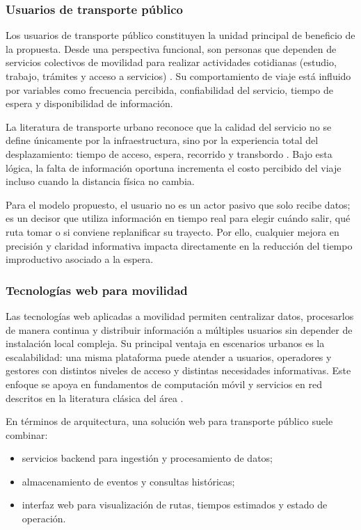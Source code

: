 \subsubsection{Usuarios de transporte público}

Los usuarios de transporte público constituyen la unidad principal de beneficio de la propuesta. Desde una perspectiva funcional, son personas que dependen de servicios colectivos de movilidad para realizar actividades cotidianas (estudio, trabajo, trámites y acceso a servicios) \cite{vuchic2007}. Su comportamiento de viaje está influido por variables como frecuencia percibida, confiabilidad del servicio, tiempo de espera y disponibilidad de información.

La literatura de transporte urbano reconoce que la calidad del servicio no se define únicamente por la infraestructura, sino por la experiencia total del desplazamiento: tiempo de acceso, espera, recorrido y transbordo \cite{vuchic2005}. Bajo esta lógica, la falta de información oportuna incrementa el costo percibido del viaje incluso cuando la distancia física no cambia.

Para el modelo propuesto, el usuario no es un actor pasivo que solo recibe datos; es un decisor que utiliza información en tiempo real para elegir cuándo salir, qué ruta tomar o si conviene replanificar su trayecto. Por ello, cualquier mejora en precisión y claridad informativa impacta directamente en la reducción del tiempo improductivo asociado a la espera.

\subsubsection{Tecnologías web para movilidad}

Las tecnologías web aplicadas a movilidad permiten centralizar datos, procesarlos de manera continua y distribuir información a múltiples usuarios sin depender de instalación local compleja. Su principal ventaja en escenarios urbanos es la escalabilidad: una misma plataforma puede atender a usuarios, operadores y gestores con distintos niveles de acceso y distintas necesidades informativas. Este enfoque se apoya en fundamentos de computación móvil y servicios en red descritos en la literatura clásica del área \cite{talukder2005,varshney2002}.

En términos de arquitectura, una solución web para transporte público suele combinar:
\begin{itemize}
    \item servicios backend para ingestión y procesamiento de datos;
    \item almacenamiento de eventos y consultas históricas;
    \item interfaz web para visualización de rutas, tiempos estimados y estado de operación.
\end{itemize}

